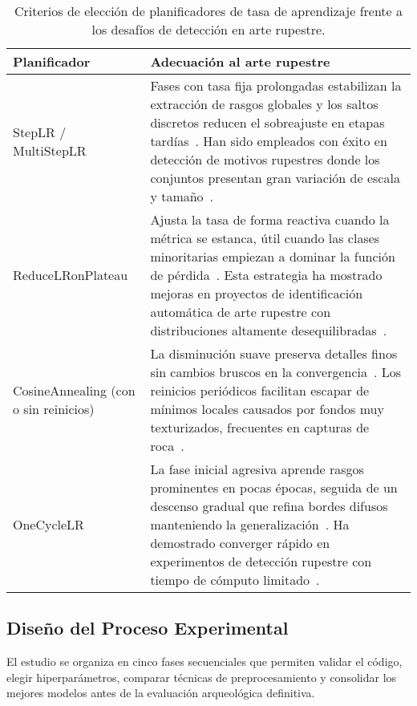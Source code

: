 \begin{table}[!h]
    \centering
    \begin{tabular}{p{3.8cm} p{10.4cm}}
        \hline
        \textbf{Planificador} & \textbf{Adecuación al arte rupestre} \\
        \hline
        StepLR / MultiStepLR &
        Fases con tasa fija prolongadas estabilizan la extracción de rasgos globales y los saltos discretos reducen el sobreajuste en etapas tardías~\cite{goyal2017,goodfellow2016deep}.
        Han sido empleados con éxito en detección de motivos rupestres donde los conjuntos presentan gran variación de escala y tamaño~\cite{suhaimi2023}. \\[0.3em]

        ReduceLRonPlateau &
        Ajusta la tasa de forma reactiva cuando la métrica se estanca, útil cuando las clases minoritarias empiezan a dominar la función de pérdida~\cite{goodfellow2016deep}.
        Esta estrategia ha mostrado mejoras en proyectos de identificación automática de arte rupestre con distribuciones altamente desequilibradas~\cite{horn2022ai}. \\[0.3em]

        CosineAnnealing (con o sin reinicios) &
        La disminución suave preserva detalles finos sin cambios bruscos en la convergencia~\cite{loshchilov2017}.
        Los reinicios periódicos facilitan escapar de mínimos locales causados por fondos muy texturizados, frecuentes en capturas de roca~\cite{sharp2024}. \\[0.3em]

        OneCycleLR &
        La fase inicial agresiva aprende rasgos prominentes en pocas épocas, seguida de un descenso gradual que refina bordes difusos manteniendo la generalización~\cite{smith2019}.
        Ha demostrado converger rápido en experimentos de detección rupestre con tiempo de cómputo limitado~\cite{suhaimi2023}. \\
    \end{tabular}
    \caption{Criterios de elección de planificadores de tasa de aprendizaje frente a los desafíos de detección en arte rupestre.}
    \label{tab:lr_schedulers}
\end{table}

\subsection{Diseño del Proceso Experimental}

El estudio se organiza en cinco fases secuenciales que permiten validar el código, elegir hiperparámetros, comparar técnicas de preprocesamiento y consolidar los mejores modelos antes de la evaluación arqueológica definitiva.


